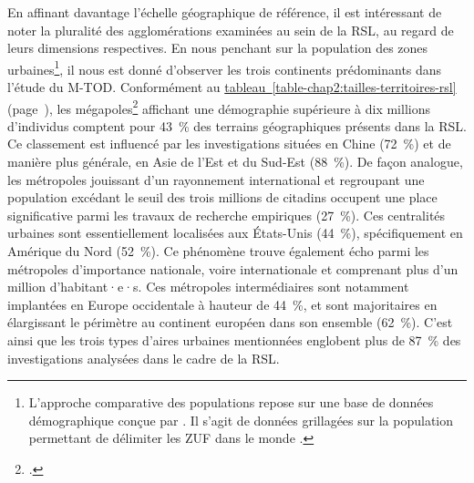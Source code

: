 \begin{refsegment}
En affinant davantage l'échelle géographique de référence, il est intéressant de noter la pluralité des agglomérations examinées au sein de la \acrshort{RSL}, au regard de leurs dimensions respectives. En nous penchant sur la population des zones urbaines\footnote{
    L'approche comparative des populations repose sur une base de données démographique conçue par \textcolor{blue}{\textcite[]{schiavina_ghs-fua_2019}}. Il s'agit de données grillagées sur la population permettant de délimiter les \acrfull{ZUF} dans le monde \textcolor{blue}{\autocite[3]{moreno-monroy_metropolitan_2021}}.
}, il nous est donné d'observer les trois continents prédominants dans l'étude du \acrshort{M-TOD}. Conformément au \hyperref[table-chap2:tailles-territoires-rsl]{tableau~\ref{table-chap2:tailles-territoires-rsl}} (page~\pageref{table-chap2:tailles-territoires-rsl}), les mégapoles\footnote{
     \textcolor{blue}{\autocite[]{geoconfluences_megapole_2023}}.
} affichant une démographie supérieure à dix millions d'individus comptent pour 43~\% des terrains géographiques présents dans la \acrshort{RSL}. Ce classement est influencé par les investigations situées en Chine (72~\%) et de manière plus générale, en Asie de l'Est et du Sud-Est (88~\%). De façon analogue, les métropoles jouissant d'un rayonnement international et regroupant une population excédant le seuil des trois millions de citadins occupent une place significative parmi les travaux de recherche empiriques (27~\%). Ces centralités urbaines sont essentiellement localisées aux États-Unis (44~\%), spécifiquement en Amérique du Nord (52~\%). Ce phénomène trouve également écho parmi les métropoles d'importance nationale, voire internationale et comprenant plus d'un million d'habitant·e·s. Ces métropoles intermédiaires sont notamment implantées en Europe occidentale à hauteur de 44~\%, et sont majoritaires en élargissant le périmètre au continent européen dans son ensemble (62~\%). C'est ainsi que les trois types d'aires urbaines mentionnées englobent plus de 87~\% des investigations analysées dans le cadre de la \acrshort{RSL}.%


\end{refsegment}
